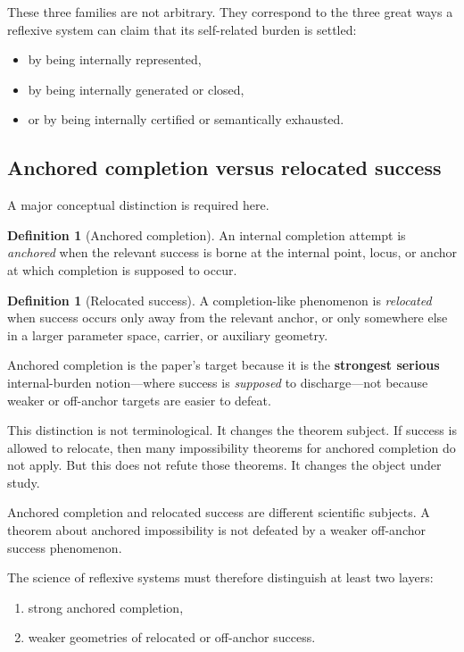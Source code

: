 \documentclass[11pt]{article}
\theoremstyle{plain}
\theoremstyle{definition}
\newtheorem{definition}[theorem]{Definition}
\theoremstyle{remark}
\begin{document}
These three families are not arbitrary. They correspond to the three great ways a reflexive system can claim that its self-related burden is settled:
\begin{itemize}
\item by being internally represented,
\item by being internally generated or closed,
\item or by being internally certified or semantically exhausted.
\end{itemize}

\subsection{Anchored completion versus relocated success}

A major conceptual distinction is required here.

\begin{definition}[Anchored completion]
An internal completion attempt is \emph{anchored} when the relevant success is borne at the internal point, locus, or anchor at which completion is supposed to occur.
\end{definition}

\begin{definition}[Relocated success]
A completion-like phenomenon is \emph{relocated} when success occurs only away from the relevant anchor, or only somewhere else in a larger parameter space, carrier, or auxiliary geometry.
\end{definition}

Anchored completion is the paper's target because it is the \textbf{strongest serious} internal-burden notion---where success is \emph{supposed} to discharge---not because weaker or off-anchor targets are easier to defeat.

This distinction is not terminological. It changes the theorem subject. If success is allowed to relocate, then many impossibility theorems for anchored completion do not apply. But this does not refute those theorems. It changes the object under study.

\begin{keybox}
Anchored completion and relocated success are different scientific subjects. A theorem about anchored impossibility is not defeated by a weaker off-anchor success phenomenon.
\end{keybox}

The science of reflexive systems must therefore distinguish at least two layers:
\begin{enumerate}[label=(\roman*)]
\item strong anchored completion,
\item weaker geometries of relocated or off-anchor success.
\end{enumerate}
\end{document}

